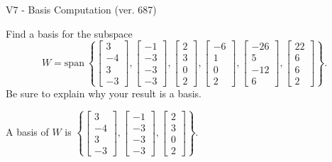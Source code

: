 \begin{exercise}
  \begin{exerciseTitle}V7 - Basis Computation (ver. 687)\end{exerciseTitle}
  \begin{exerciseStatement}
    Find a basis for the subspace 
\[W=\mathrm{span}\ \left\{\left[\begin{array}{r}
3 \\
-4 \\
3 \\
-3
\end{array}\right] , \left[\begin{array}{r}
-1 \\
-3 \\
-3 \\
-3
\end{array}\right] , \left[\begin{array}{r}
2 \\
3 \\
0 \\
2
\end{array}\right] , \left[\begin{array}{r}
-6 \\
1 \\
0 \\
2
\end{array}\right] , \left[\begin{array}{r}
-26 \\
5 \\
-12 \\
6
\end{array}\right] , \left[\begin{array}{r}
22 \\
6 \\
6 \\
2
\end{array}\right]\right\}.\]
 Be sure to explain why your result is a basis.


  \end{exerciseStatement}
  \begin{exerciseAnswer}
   A basis of \(W\) is  \(\left\{\left[\begin{array}{r}
3 \\
-4 \\
3 \\
-3
\end{array}\right] , \left[\begin{array}{r}
-1 \\
-3 \\
-3 \\
-3
\end{array}\right] , \left[\begin{array}{r}
2 \\
3 \\
0 \\
2
\end{array}\right]\right\}\).
  


  \end{exerciseAnswer}
\end{exercise}